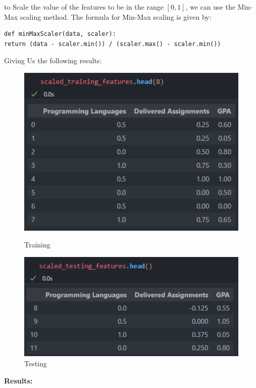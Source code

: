 \documentclass[a4paper,12pt]{article}
\begin{document}
to Scale the value of the features to be in the range \([0,1]\), we can use the Min-Max scaling method. The formula for Min-Max scaling is given by:
\begin{verbatim}
def minMaxScaler(data, scaler):
return (data - scaler.min()) / (scaler.max() - scaler.min())
\end{verbatim}
Giving Us the following results:
\begin{figure}[H]
    \centering
    \begin{minipage}{0.4\textwidth}
        \centering
        \includegraphics[width=\textwidth]{minmax0.png}
        \caption{Training}
        \label{fig:MinMax_training}
    \end{minipage}\hfill
    \begin{minipage}{0.55\textwidth}
        \centering
        \includegraphics[width=\textwidth]{minmax1.png}
        \caption{Testing}
        \label{fig:MinMax_testing}
    \end{minipage}
\end{figure}
\textbf{Results:}
\end{document}
